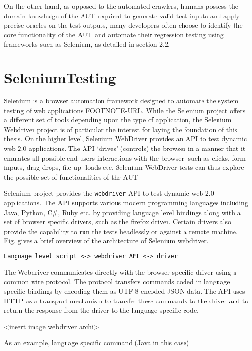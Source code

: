 On the other hand, as opposed to the automated crawlers, humans possess the domain knowledge of the AUT required to generate valid test inputs and apply precise oracles on the test outputs, many developers often choose to identify the core functionality of the AUT and automate their regression testing using frameworks such as  Selenium, as detailed in section 2.2.

\section{SeleniumTesting}
\label{sec:SeleniumTesting}

Selenium is a browser automation framework designed to automate the system testing of web applications FOOTNOTE-URL. While the Selenium project offers a different set of tools depending upon the type of application, the Selenium Webdriver project is of particular the interest for laying the foundation of this thesis. On the higher level, Selenium WebDriver provides an API to test dynamic web 2.0 applications. The API ‘drives’ (controls) the browser in a manner that it emulates all possible end users interactions with the browser, such as clicks, form-inputs, drag-drops, file up- loads etc. Selenium WebDriver tests can thus explore the possible set of functionalities of the AUT 

Selenium project provides the \texttt{webdriver} API to test dynamic web 2.0 applications. The API supports various modern programming languages including Java, Python, C\#, Ruby etc. by providing language level bindings along with a set of browser specific drivers, such as the firefox driver. Certain drivers also provide the capability to run the tests headlessly or against a remote machine. Fig. gives a brief overview of the architecture of Selenium webdriver. 
\begin{verbatim}
Language level script <-> webdriver API <-> driver
\end{verbatim}
The Webdriver communicates directly with the browser specific driver using a common wire protocol. The protocol transfers commands coded in language specific bindings by encoding them as UTF-8 encoded JSON data. The API uses  HTTP as a transport mechanism to transfer these commands to the driver and to return the response from the driver to the language specific code. 

<insert image webdriver archi>

As an example, 
language specific command (Java in this case) 

